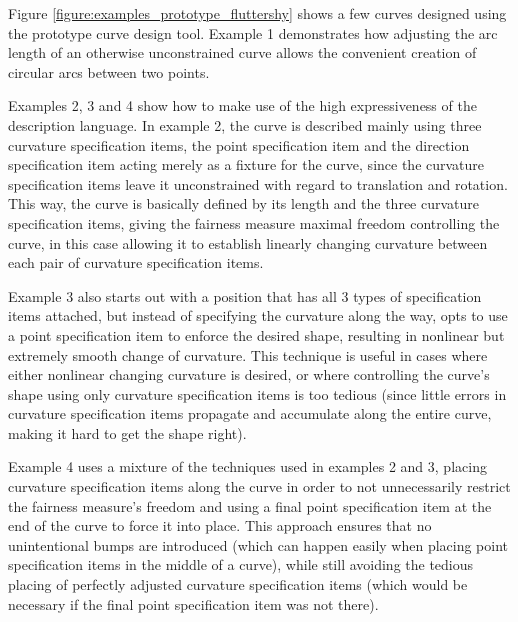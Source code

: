 \documentclass[a4paper]{article}
\begin{document}
			Figure \ref{figure:examples_prototype_fluttershy} shows a few curves designed using the prototype curve design tool. Example 1 demonstrates how adjusting the arc length of an otherwise unconstrained curve allows the convenient creation of circular arcs between two points.

			Examples 2, 3 and 4 show how to make use of the high expressiveness of the description language. In example 2, the curve is described mainly using three curvature specification items, the point specification item and the direction specification item acting merely as a fixture for the curve, since the curvature specification items leave it unconstrained with regard to translation and rotation. This way, the curve is basically defined by its length and the three curvature specification items, giving the fairness measure maximal freedom controlling the curve, in this case allowing it to establish linearly changing curvature between each pair of curvature specification items.

			Example 3 also starts out with a position that has all 3 types of specification items attached, but instead of specifying the curvature along the way, opts to use a point specification item to enforce the desired shape, resulting in nonlinear but extremely smooth change of curvature. This technique is useful in cases where either nonlinear changing curvature is desired, or where controlling the curve's shape using only curvature specification items is too tedious (since little errors in curvature specification items propagate and accumulate along the entire curve, making it hard to get the shape right).

			Example 4 uses a mixture of the techniques used in examples 2 and 3, placing curvature specification items along the curve in order to not unnecessarily restrict the fairness measure's freedom and using a final point specification item at the end of the curve to force it into place. This approach ensures that no unintentional bumps are introduced (which can happen easily when placing point specification items in the middle of a curve), while still avoiding the tedious placing of perfectly adjusted curvature specification items (which would be necessary if the final point specification item was not there).
\end{document}
